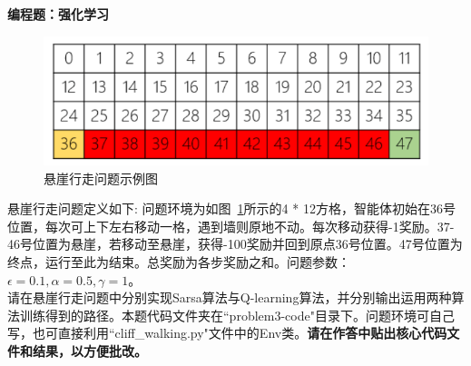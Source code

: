 \documentclass[answers]{exam}  %
\begin{document}
\begin{questions}
\begin{solution}
\begin{parts}
			\part 
			\part 
			\part 
			\part 
		\end{parts}
	\end{solution}


\question [30] \textbf{编程题：强化学习}
	\begin{figure}
		\centering
		\includegraphics[width=0.7\linewidth]{problem3-code/env.PNG}
		\caption{悬崖行走问题示例图} \label{fig:q3-env}
	\end{figure}

	悬崖行走问题定义如下: 问题环境为如图~\ref{fig:q3-env}所示的4 * 12方格，智能体初始在36号位置，每次可上下左右移动一格，遇到墙则原地不动。每次移动获得-1奖励。37-46号位置为悬崖，若移动至悬崖，获得-100奖励并回到原点36号位置。47号位置为终点，运行至此为结束。总奖励为各步奖励之和。问题参数：$\epsilon=0.1,\alpha=0.5,\gamma=1$。\\
	请在悬崖行走问题中分别实现Sarsa算法与Q-learning算法，并分别输出运用两种算法训练得到的路径。本题代码文件夹在``problem3-code"目录下。问题环境可自己写，也可直接利用``cliff\_walking.py"文件中的Env类。\textbf{请在作答中贴出核心代码文件和结果，以方便批改。}
	
	\begin{solution}
		
	\end{solution}
	
\end{questions}
\end{document}
